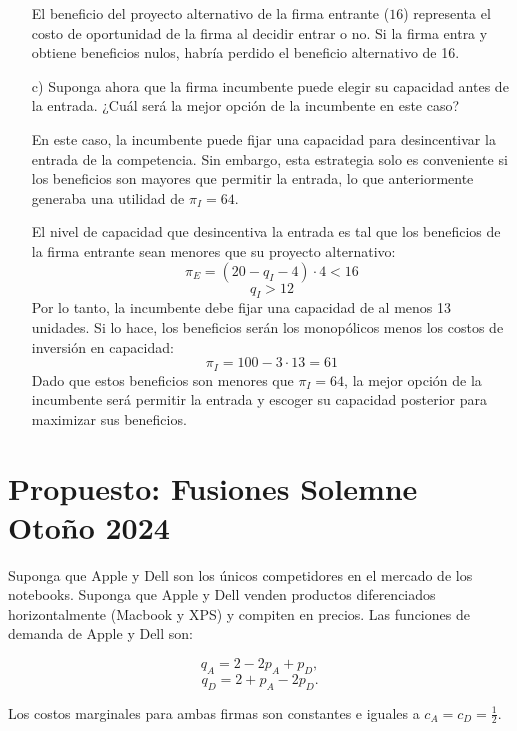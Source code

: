 \documentclass{exam}
\begin{document}
\begin{itemize}
\begin{solution}
        El beneficio del proyecto alternativo de la firma entrante (\( 16 \)) representa el costo de oportunidad de la firma al decidir entrar o no. Si la firma entra y obtiene beneficios nulos, habría perdido el beneficio alternativo de 16.
    \end{solution}
    \item[c)] Suponga ahora que la firma incumbente puede elegir su capacidad antes de la entrada. ¿Cuál será la mejor opción de la incumbente en este caso?
    \begin{solution}
        En este caso, la incumbente puede fijar una capacidad para desincentivar la entrada de la competencia. Sin embargo, esta estrategia solo es conveniente si los beneficios son mayores que permitir la entrada, lo que anteriormente generaba una utilidad de \( \pi_I = 64 \).

        El nivel de capacidad que desincentiva la entrada es tal que los beneficios de la firma entrante sean menores que su proyecto alternativo:
        \[
        \pi_E = (20 - q_I - 4) \cdot 4 < 16
        \]
        \[
        q_I > 12
        \]
        Por lo tanto, la incumbente debe fijar una capacidad de al menos 13 unidades. Si lo hace, los beneficios serán los monopólicos menos los costos de inversión en capacidad:
        \[
        \pi_I = 100 - 3 \cdot 13 = 61
        \]
        Dado que estos beneficios son menores que \( \pi_I = 64 \), la mejor opción de la incumbente será permitir la entrada y escoger su capacidad posterior para maximizar sus beneficios.
    \end{solution}
\end{itemize}

\section{Propuesto: Fusiones Solemne Otoño 2024}

Suponga que Apple y Dell son los únicos competidores en el mercado de los notebooks. Suponga
que Apple y Dell venden productos diferenciados horizontalmente (Macbook y XPS) y compiten
en precios. Las funciones de demanda de Apple y Dell son:

\[
q_A = 2 - 2p_A + p_D,
\]
\[
q_D = 2 + p_A - 2p_D.
\]

Los costos marginales para ambas firmas son constantes e iguales a \( c_A = c_D = \frac{1}{2} \).
\end{document}
